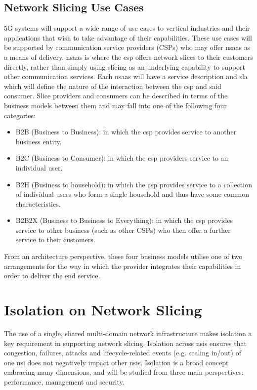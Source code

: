 \subsection{Network Slicing Use Cases}
    5G systems will support a wide range of use cases to vertical industries and their applications that wish to take advantage of their capabilities. These use cases will be supported by communication service providers (CSPs) who may offer \acrfull{nsaas} as a means of delivery. \acrshort{nsaas} is where the \acrshort{csp} offers network slices to their customers directly, rather than simply using slicing as an underlying capability to support other communication services. Each \acrshort{nsaas} will have a service description and \acrshort{sla} which will define the nature of the interaction between the \acrshort{csp} and said consumer.
    Slice providers and consumers can be described in terms of the business models between them and may fall into one of the following four categories:
    \begin{itemize}
    \item B2B (Business to Business): in which the \acrshort{csp} provides service to another business entity.
    \item B2C (Business to Consumer): in which the \acrshort{csp} providers service to an individual user.
    \item B2H (Business to household): in which the \acrshort{csp} provides service to a collection of individual users who form a single household and thus have some common characteristics.
    \item B2B2X (Business to Business to Everything): in which the \acrshort{csp} provides service to other business (such as other CSPs) who then offer a further service to their customers. 
    \end{itemize}
    From an architecture perspective, these four business models utilise one of two arrangements for the way in which the provider integrates their capabilities in order to deliver the end service.

\newpage

\section{Isolation on Network Slicing}
The use of a single, shared multi-domain network infrastructure makes isolation a key requirement in supporting network slicing. Isolation across \acrshort{nsi}s ensures that congestion, failures, attacks and lifecycle-related events (e.g. scaling in/out) of one \acrshort{nsi} does not negatively impact other \acrshort{nsi}s. Isolation is a broad concept embracing many dimensions, and will be studied from three main perspectives: performance, management and security. 


